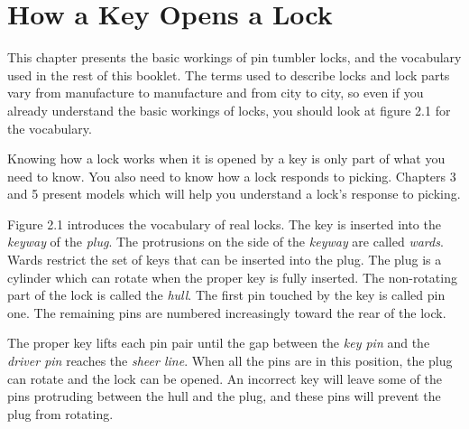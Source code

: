 \chapter{How a Key Opens a Lock}
This chapter presents the basic workings of pin tumbler locks, and the vocabulary used in the
rest of this booklet. The terms used to describe locks and lock parts vary from manufacture
to manufacture and from city to city, so even if you already understand the basic workings
of locks, you should look at figure 2.1 for the vocabulary.

Knowing how a lock works when it is opened by a key is only part of what you need to
know. You also need to know how a lock responds to picking. Chapters 3 and 5 present
models which will help you understand a lock's response to picking.

Figure 2.1 introduces the vocabulary of real locks. The key is inserted into the \textit{keyway}
of the \textit{plug}. The protrusions on the side of the \textit{keyway} are called \textit{wards}. Wards restrict the set of keys that can be inserted into the plug. The plug is a cylinder which can rotate when
the proper key is fully inserted. The non-rotating part of the lock is called the \textit{hull}. The
first pin touched by the key is called pin one. The remaining pins are numbered increasingly
toward the rear of the lock.

The proper key lifts each pin pair until the gap between the \textit{key pin} and the \textit{driver pin}
reaches the \textit{sheer line}. When all the pins are in this position, the plug can rotate and the
lock can be opened. An incorrect key will leave some of the pins protruding between the
hull and the plug, and these pins will prevent the plug from rotating.
